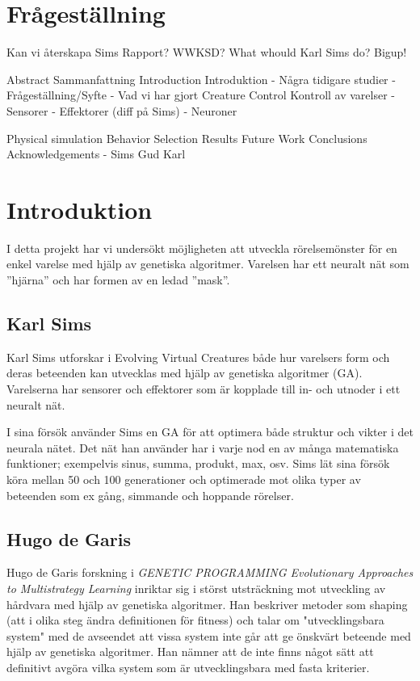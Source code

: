 \documentclass[titlepage, twocolumn, a4paper, 12pt]{article}
\begin{document}
\section{Frågeställning}
Kan vi återskapa Sims Rapport? WWKSD? What whould Karl Sims do? Bigup!


Abstract Sammanfattning
Introduction Introduktion
    - Några tidigare studier
    - Frågeställning/Syfte
    - Vad vi har gjort
Creature Control Kontroll av varelser
  - Sensorer
  - Effektorer (diff på Sims)
  - Neuroner
  
Physical simulation
Behavior Selection
Results
Future Work
Conclusions
Acknowledgements
    - Sims Gud Karl



\section{Introduktion}

I detta projekt har vi undersökt möjligheten att utveckla rörelsemönster för en enkel varelse med hjälp av genetiska algoritmer. Varelsen har ett neuralt nät som ”hjärna” och har formen av en ledad ”mask”.

\subsection{Karl Sims}
Karl Sims utforskar i Evolving Virtual Creatures \cite{sims} både hur varelsers form och deras beteenden kan utvecklas med hjälp av genetiska algoritmer (GA). Varelserna har sensorer och effektorer som är kopplade till in- och utnoder i ett neuralt nät. 

I sina försök använder Sims en GA för att optimera både struktur och vikter i det neurala nätet. Det nät han använder har i varje nod en av många matematiska funktioner; exempelvis sinus, summa, produkt, max, osv. Sims lät sina försök köra mellan 50 och 100 generationer och optimerade mot olika typer av beteenden som ex gång, simmande och hoppande rörelser. 

\subsection{Hugo de Garis}
Hugo de Garis forskning i \textit{GENETIC PROGRAMMING Evolutionary Approaches to Multistrategy Learning} \cite{garis} inriktar sig i störst utsträckning mot utveckling av hårdvara med hjälp av genetiska algoritmer. Han beskriver metoder som shaping (att i olika steg ändra definitionen för fitness) och talar om "utvecklingsbara system" med de avseendet att vissa system inte går att ge önskvärt beteende med hjälp av genetiska algoritmer. Han nämner att de inte finns något sätt att definitivt avgöra vilka system som är utvecklingsbara med fasta kriterier.
\end{document}
